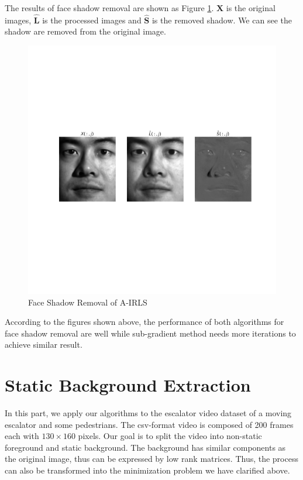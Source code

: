\documentclass[conference]{IEEEtran}
\begin{document}
The results of face shadow removal are shown  as Figure \ref{irls_face2}. $\boldsymbol{X}$ is the original images, $\boldsymbol{\widehat{L}}$ is the processed images and $\boldsymbol{\widehat{S}}$ is the removed shadow. We can see the shadow are removed from the original image.

\begin{figure}[htbp]
	\centering
	\includegraphics[width=1\linewidth]{image/Figure 8 A-IRLS}
	\caption{Face Shadow Removal of A-IRLS}
	\label{irls_face2}
\end{figure}


According to the figures shown above, the performance of both algorithms for face shadow removal are well while sub-gradient method needs more iterations to achieve similar result.

\section{Static Background Extraction}
In this part, we apply our algorithms to the escalator video dataset of a moving escalator and some pedestrians. The csv-format video is composed of 200 frames each with $130 \times 160$ pixels. Our goal is to split the video into non-static foreground and static background. 
The background has similar components as the original image, thus can be expressed by low rank matrices. Thus, the process can also be transformed into the minimization problem we have clarified above.
\end{document}
